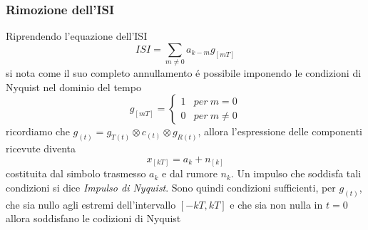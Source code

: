         \subsubsection{Rimozione dell'ISI}
            Riprendendo l'equazione dell'ISI
            \[
                ISI =  \sum_{m\neq 0}a_{k-m}g_{[mT]}
            \]
            si nota come il suo completo annullamento é possibile imponendo le condizioni di Nyquist \label{Condizioni di Nyquist} nel dominio del tempo
            \[
                g_{[mT]} = 
                \begin{cases}
                    1   &per \ m=0\nonumber \\
                    0   &per \ m\neq 0\nonumber
                \end{cases}  
            \]
            ricordiamo che $g_{(t)} = g_{T(t)} \otimes c_{(t)} \otimes g_{R(t)}$, allora l'espressione delle componenti 
            ricevute diventa
            \[
                x_{[kT]} = a_k+n_{[k]}  
            \]
            costituita dal simbolo trasmesso $a_k$ e dal rumore $n_k$. Un impulso che soddisfa tali condizioni si dice \emph{Impulso di Nyquist}.
            Sono quindi condizioni sufficienti, per $g_(t)$, che sia nullo agli estremi dell'intervallo $[-kT,kT]$ e che sia non nulla in $t=0$
            allora soddisfano le codizioni di Nyquist
            \begin{figure}[H]
                \centering
            \end{figure}
